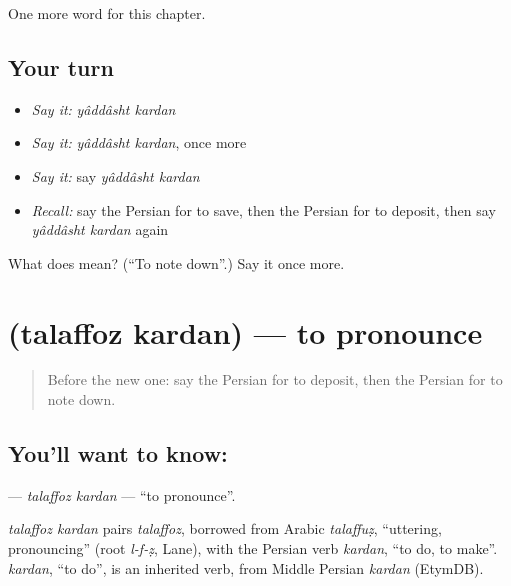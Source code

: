 \begin{grammarlens}[title={What you've built}]
One more word for this chapter.
\end{grammarlens}

\subsection*{Your turn}
\begin{itemize}
\raggedright
  \item \emph{Say it:} \emph{yâddâsht kardan}
  \item \emph{Say it:} \emph{yâddâsht kardan}, once more
  \item \emph{Say it:} say \emph{yâddâsht kardan}
  \item \emph{Recall:} say the Persian for to save, then the Persian for to deposit, then say \emph{yâddâsht kardan} again
\end{itemize}

\begin{tcolorbox}[breakable,colback=teal!4,colframe=teal!35!black,title={Before you move on}]
What does   mean? (\textquotedblleft{}To note down\textquotedblright{}.) Say it once more.
\end{tcolorbox}
\section[\texorpdfstring{\fa{تلفظ} \fa{کردن} (talaffoz kardan)}{تلفظ کردن (talaffoz kardan)}]{  (talaffoz kardan) — to pronounce}

\label{lesson:FA-C188-talaffoz-kardan}



\begin{quote}
Before the new one: say the Persian for to deposit, then the Persian for to note down.
\end{quote}

\subsection*{You'll want to know:  }
\textbf{ } — \emph{talaffoz kardan} — \textquotedblleft{}to pronounce\textquotedblright{}.

\begin{cousinweb}
\emph{talaffoz kardan} pairs \emph{talaffoz}, borrowed from Arabic \emph{talaffuẓ}, \textquotedblleft{}uttering, pronouncing\textquotedblright{} (root \emph{l-f-ẓ}, Lane), with the Persian verb \emph{kardan}, \textquotedblleft{}to do, to make\textquotedblright{}. \emph{kardan}, \textquotedblleft{}to do\textquotedblright{}, is an inherited verb, from Middle Persian \emph{kardan} (EtymDB).
\end{cousinweb}

